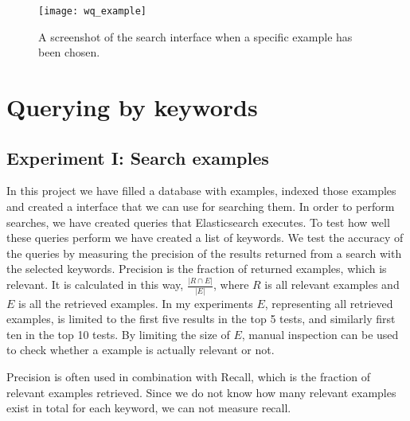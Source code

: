 \begin{figure}[H] 
\caption{A screenshot of the search interface when a specific example has been chosen.}
\texttt{[image: wq\_example]}
\label{fig:wq_example}
\end{figure}

\section{Querying by keywords} \label{5:keywords}

\subsection{Experiment I: Search examples} \label{search_experiment}
In this project we have filled a database with examples, indexed those examples and created a interface that we can use for searching them. In order to perform searches, we have created queries that Elasticsearch executes. To test how well these queries perform we have created a list of keywords. We test the accuracy of the queries by measuring the precision of the results returned from a search with the selected  keywords. Precision is the fraction of returned examples, which is relevant. It is calculated in this way, \(\frac{|R \cap E |}{|E|}\), where \(R\) is all relevant examples and \(E\) is all the retrieved examples.
In my experiments \(E\), representing all retrieved examples, is limited to the first five results in the top 5 tests, and similarly first ten in the top 10 tests. By limiting the size of \(E\), manual inspection can be used to check whether a example is actually relevant or not.

Precision is often used in combination with Recall, which is the fraction of relevant examples retrieved. Since we do not know how many relevant examples exist in total for each keyword, we can not measure recall. 


